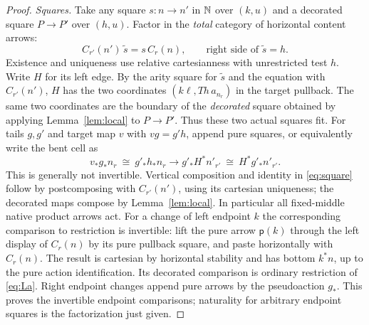 \documentclass[11pt]{article}
\theoremstyle{definition}\newtheorem{definition}[theorem]{Definition}
\newcommand{\pure}{\mathsf{p}}\newcommand{\grade}{\mathsf G}
\begin{document}
\begin{proof}
\emph{Squares.} Take any square $s:n\to n'$ in $\mathbb N$ over $(k,u)$
and a decorated square $P\to P'$ over $(h,u)$. Factor in the
\emph{total} category of horizontal content arrows:
\[
 C_{r'}(n')\,\widetilde s=s\,C_r(n),\qquad
       \text{right side of }\widetilde s=h.
 \tag{7}\label{eq:square}
\]
Existence and uniqueness use relative cartesianness with unrestricted
test $h$. Write $H$ for its left edge. By the arity square for
$\widetilde s$ and the equation with $C_{r'}(n')$, $H$ has the two
coordinates $(k\ell,Th\,a_{n_r})$ in the target pullback.
The same two coordinates are the boundary of the \emph{decorated}
square obtained by applying Lemma~\ref{lem:local} to $P\to P'$.
Thus these two actual squares fit. For tails $g,g'$ and target map $v$
with $vg=g'h$, append pure squares, or equivalently write the bent
cell as
\[
 v_*g_* n_r \ \cong\ g'_*h_* n_r
 \longrightarrow g'_*H^*n'_{r'}\ \cong\ H^*g'_*n'_{r'} .
\]
This is generally not invertible. Vertical composition and identity
in \eqref{eq:square} follow by postcomposing with $C_{r'}(n')$,
using its cartesian uniqueness; the decorated maps compose by
Lemma~\ref{lem:local}. In particular all fixed-middle native product
arrows act. For a change of left endpoint $k$ the corresponding
comparison to restriction is invertible: lift the pure arrow
$\pure(k)$ through the left display of $C_r(n)$ by its pure pullback
square, and paste horizontally with $C_r(n)$. The result is cartesian
by horizontal stability and has bottom $k^*n$, up to the pure action
identification. Its decorated comparison is ordinary restriction of
\eqref{eq:La}. Right endpoint changes append pure arrows by the
pseudoaction $g_*$. This proves the invertible endpoint comparisons;
naturality for arbitrary endpoint squares is the factorization just
given.


\end{proof}
\end{document}
